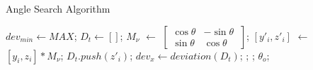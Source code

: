 \begin{algorithm}
\caption{Angle Search Algorithm}
\label{search}
\begin{algorithmic}[1]
\State $dev_{min} \gets MAX$;
\State $D_{t} \gets []$;
\State $M_\nu$ $\gets$ $\begin{bmatrix}\cos\theta & -\sin\theta\ \\ \sin\theta & \cos\theta \end{bmatrix}$;
\State $[y'_i,z'_i]$ $\gets$ $[y_i,z_i]* M_\nu$;
\State $D_t.push(z'_i)$;
\EndFor
\State $dev_x \gets deviation(D_t)$;
;
;
\EndIf
\EndFor
\Return $\theta_{o}$;
\EndProcedure
\end{algorithmic}
\end{algorithm}
\vspace{-0.6cm}



